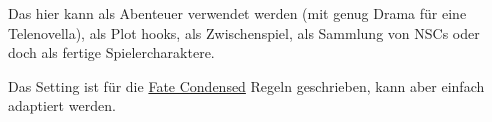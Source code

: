\documentclass{book}
\begin{document}
Das hier kann als Abenteuer verwendet werden (mit genug Drama für eine Telenovella), als Plot hooks, als Zwischenspiel, als Sammlung von NSCs oder doch als fertige Spielercharaktere.

Das Setting ist für die \href{https://fate-srd.com/fate-condensed}{Fate Condensed} Regeln geschrieben, kann aber einfach adaptiert werden.






\end{document}
